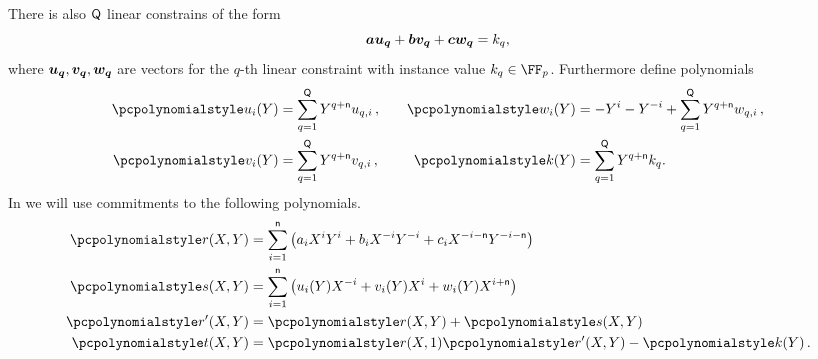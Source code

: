 \let\accentvec\vec \documentclass[runningheads]{llncs}
\def\vec#1{\mathchoice{\mbox{\boldmath$\displaystyle#1$}}
{\mbox{\boldmath$\textstyle#1$}} {\mbox{\boldmath$\scriptstyle#1$}}
{\mbox{\boldmath$\scriptscriptstyle#1$}}}
\begin{document}
	There is also $\mathsf{Q}$ linear constrains of the form 
	\[
		\va \vec{u_q} + \vb \vec{v_q} + \vc \vec{w_q} = k_q,
	\]
	where $\vec{u_q}, \vec{v_q}, \vec{w_q}$ are vectors for the $q$-th linear
	constraint with instance value $k_q \in \FF_p$. Furthermore define polynomials
\begin{equation}
	\begin{split}
		\p{u_i}(Y) & = \sum_{q = 1}^\linconstr Y^{q + \multconstr} u_{q, i}\,,\\
		\p{v_i}(Y) & = \sum_{q = 1}^\linconstr Y^{q + \multconstr} v_{q, i}\,,\\
	\end{split}
	\qquad
	\begin{split}
		\p{w_i}(Y) & = -Y^i - Y^{-i}  + \sum_{q = 1}^\linconstr Y^{q +
		\multconstr} w_{q, i}\,,\\
		\p{k}(Y) & = \sum_{q = 1}^\linconstr Y^{q + \multconstr} k_{q}.
	\end{split}
\end{equation}
In \sonic{} we will use commitments to the following polynomials.
\begin{align*}
	\pr(X, Y) & = \sum_{i = 1}^{\multconstr} \left(a_i X^i Y^i + b_i X^{-i} Y^{-i}
	+ c_i X^{-i - \multconstr} Y^{-i - \multconstr}\right) \\
	\p{s}(X, Y) & = \sum_{i = 1}^{\multconstr} \left( u_i (Y) X^{-i} +
	v_i(Y) X^i + w_i(Y) X^{i + \multconstr}\right)\\
		\pr'(X, Y) & = \pr(X, Y) + \p{s}(X, Y) \\
		\pt(X, Y) & = \pr(X, 1) \pr'(X, Y) - \p{k}(Y)\,.
\end{align*}
	
\end{document}
